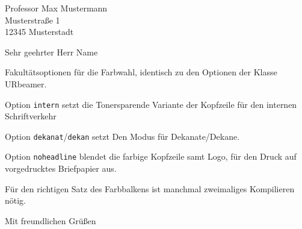\documentclass[ngerman,lco=UR-Adressdaten,intern]{URletter}
\begin{document}
\begin{letter}{Professor Max Mustermann \\ Musterstraße 1\\ 12345 Musterstadt}
\opening{Sehr geehrter Herr Name}
Fakultätsoptionen für die Farbwahl, identisch zu den Optionen der Klasse URbeamer.

Option \texttt{intern} setzt die Tonersparende Variante der Kopfzeile für den internen Schriftverkehr

Option \texttt{dekanat}/\texttt{dekan} setzt Den Modus für Dekanate/Dekane.

Option \texttt{noheadline} blendet die farbige Kopfzeile samt Logo, für den Druck auf vorgedrucktes Briefpapier aus.

Für den richtigen Satz des Farbbalkens ist manchmal zweimaliges Kompilieren nötig.

\closing{Mit freundlichen Grüßen}

\end{letter}
\end{document}
